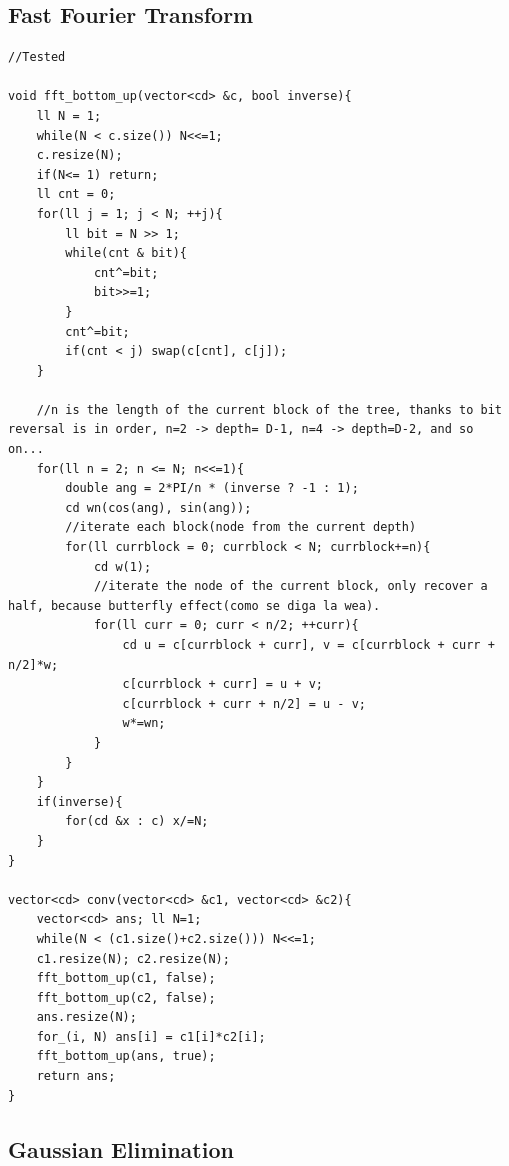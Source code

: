 \documentclass[10pt,a4paper,twocolumn]{article}
\begin{document}
	\subsection{Fast Fourier Transform}
	
	\begin{lstlisting}[style=cpp, title={fft.cpp}]
//Tested

void fft_bottom_up(vector<cd> &c, bool inverse){
    ll N = 1;
    while(N < c.size()) N<<=1;
    c.resize(N);
    if(N<= 1) return;
    ll cnt = 0;
    for(ll j = 1; j < N; ++j){
        ll bit = N >> 1;
        while(cnt & bit){
            cnt^=bit;
            bit>>=1;
        }
        cnt^=bit;
        if(cnt < j) swap(c[cnt], c[j]);
    }

    //n is the length of the current block of the tree, thanks to bit reversal is in order, n=2 -> depth= D-1, n=4 -> depth=D-2, and so on...
    for(ll n = 2; n <= N; n<<=1){
        double ang = 2*PI/n * (inverse ? -1 : 1);
        cd wn(cos(ang), sin(ang));
        //iterate each block(node from the current depth)
        for(ll currblock = 0; currblock < N; currblock+=n){
            cd w(1);
            //iterate the node of the current block, only recover a half, because butterfly effect(como se diga la wea).
            for(ll curr = 0; curr < n/2; ++curr){
                cd u = c[currblock + curr], v = c[currblock + curr + n/2]*w;
                c[currblock + curr] = u + v;
                c[currblock + curr + n/2] = u - v;
                w*=wn;
            }
        }
    }
    if(inverse){
        for(cd &x : c) x/=N; 
    }
}

vector<cd> conv(vector<cd> &c1, vector<cd> &c2){
    vector<cd> ans; ll N=1;
    while(N < (c1.size()+c2.size())) N<<=1;
    c1.resize(N); c2.resize(N);
    fft_bottom_up(c1, false);
    fft_bottom_up(c2, false);
    ans.resize(N);
    for_(i, N) ans[i] = c1[i]*c2[i];
    fft_bottom_up(ans, true);
    return ans;
}
	\end{lstlisting}

	\subsection{Gaussian Elimination}
	
\end{document}
